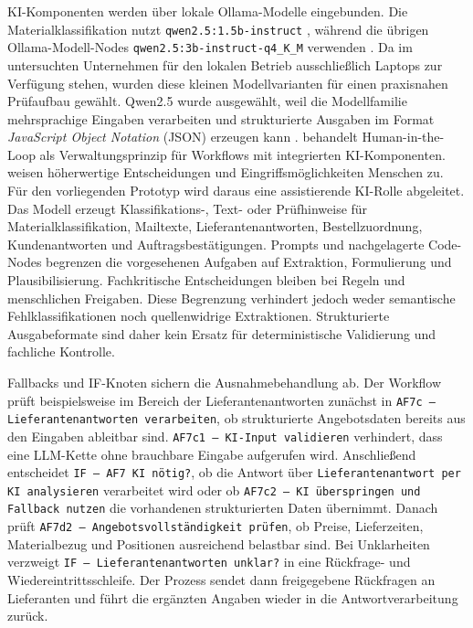 \documentclass[a4paper,12pt]{article}
\begin{document}
KI-Komponenten werden über lokale Ollama-Modelle eingebunden. Die Materialklassifikation nutzt \texttt{qwen2.5:1.5b-instruct} \parencite{ollama_qwen25_2026}, während die übrigen Ollama-Modell-Nodes \texttt{qwen2.5:3b-instruct-q4\_K\_M} verwenden \parencite{ollama_qwen25_3b_2026}. Da im untersuchten Unternehmen für den lokalen Betrieb ausschließlich Laptops zur Verfügung stehen, wurden diese kleinen Modellvarianten für einen praxisnahen Prüfaufbau gewählt. Qwen2.5 wurde ausgewählt, weil die Modellfamilie mehrsprachige Eingaben verarbeiten und strukturierte Ausgaben im Format \textit{JavaScript Object Notation} (JSON) erzeugen kann \parencite{qwen_team_qwen25_2024}. \textcite{venkiteela_n8n_2025} behandelt Human-in-the-Loop als Verwaltungsprinzip für Workflows mit integrierten KI-Komponenten. \Textcite{ng_systematic_2021} weisen höherwertige Entscheidungen und Eingriffsmöglichkeiten Menschen zu. Für den vorliegenden Prototyp wird daraus eine assistierende KI-Rolle abgeleitet. Das Modell erzeugt Klassifikations-, Text- oder Prüfhinweise für Materialklassifikation, Mailtexte, Lieferantenantworten, Bestellzuordnung, Kundenantworten und Auftragsbestätigungen. Prompts und nachgelagerte Code-Nodes begrenzen die vorgesehenen Aufgaben auf Extraktion, Formulierung und Plausibilisierung. Fachkritische Entscheidungen bleiben bei Regeln und menschlichen Freigaben. Diese Begrenzung verhindert jedoch weder semantische Fehlklassifikationen noch quellenwidrige Extraktionen. Strukturierte Ausgabeformate sind daher kein Ersatz für deterministische Validierung und fachliche Kontrolle.

Fallbacks und IF-Knoten sichern die Ausnahmebehandlung ab. Der Workflow prüft beispielsweise im Bereich der Lieferantenantworten zunächst in \texttt{AF7c -- Lieferantenantworten verarbeiten}, ob strukturierte Angebotsdaten bereits aus den Eingaben ableitbar sind. \texttt{AF7c1 -- KI-Input validieren} verhindert, dass eine LLM-Kette ohne brauchbare Eingabe aufgerufen wird. Anschließend entscheidet \texttt{IF -- AF7 KI nötig?}, ob die Antwort über \texttt{Lieferantenantwort per KI analysieren} verarbeitet wird oder ob \texttt{AF7c2 -- KI überspringen und Fallback nutzen} die vorhandenen strukturierten Daten übernimmt. Danach prüft \texttt{AF7d2 -- Angebotsvollständigkeit prüfen}, ob Preise, Lieferzeiten, Materialbezug und Positionen ausreichend belastbar sind. Bei Unklarheiten verzweigt \texttt{IF -- Lieferantenantworten unklar?} in eine Rückfrage- und Wiedereintrittsschleife. Der Prozess sendet dann freigegebene Rückfragen an Lieferanten und führt die ergänzten Angaben wieder in die Antwortverarbeitung zurück.
\end{document}
